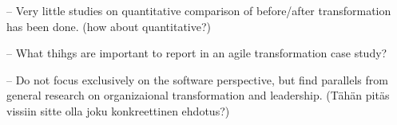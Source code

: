 \documentclass[lnbip]{svmultln}
\begin{document}
-- Very little studies on quantitative comparison of before/after transformation
has been done. (how about quantitative?)

-- What thihgs are important to report in an agile transformation case study?

-- Do not focus exclusively on the software perspective, but find parallels from
general research on organizaional transformation and leadership. (Tähän pitäs
vissiin sitte olla joku konkreettinen ehdotus?)






\end{document}
